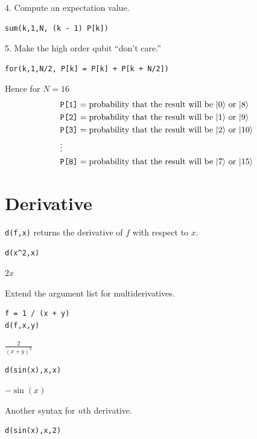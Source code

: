 \documentclass[12pt]{article}
\begin{document}
4. Compute an expectation value.
{\color{blue}
\begin{verbatim}
sum(k,1,N, (k - 1) P[k])
\end{verbatim}
}

5. Make the high order qubit ``don't care.''
{\color{blue}
\begin{verbatim}
for(k,1,N/2, P[k] = P[k] + P[k + N/2])
\end{verbatim}
}

Hence for $N=16$
\begin{align*}
&\text{\tt P[1]}=\text{probability that the result will be $|0\rangle$ or $|8\rangle$}
\\
&\text{\tt P[2]}=\text{probability that the result will be $|1\rangle$ or $|9\rangle$}
\\
&\text{\tt P[3]}=\text{probability that the result will be $|2\rangle$ or $|10\rangle$}
\\
&\vdots
\\
&\text{\tt P[8]}=\text{probability that the result will be $|7\rangle$ or $|15\rangle$}
\end{align*}

\newpage

\section{Derivative}

\verb$d(f,x)$ returns the derivative of $f$ with respect to $x$.

{\color{blue}
\begin{verbatim}
d(x^2,x)
\end{verbatim}}

$2x$

\bigskip
Extend the argument list for multiderivatives.

{\color{blue}
\begin{verbatim}
f = 1 / (x + y)
d(f,x,y)
\end{verbatim}}

$\displaystyle
\frac{2}{(x+y)^3}
$

{\color{blue}
\begin{verbatim}
d(sin(x),x,x)
\end{verbatim}}

$-\sin(x)$

\bigskip
Another syntax for $n$th derivative.

{\color{blue}
\begin{verbatim}
d(sin(x),x,2)
\end{verbatim}}
\end{document}
